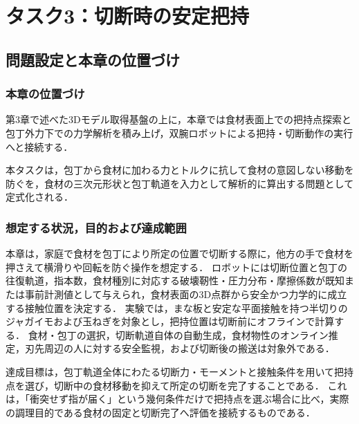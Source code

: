 \chapter{タスク3：切断時の安定把持}
\label{ch:holding}

\section{問題設定と本章の位置づけ}
\label{sec:holding_problem_and_role}

\subsection{本章の位置づけ}
\label{subsec:holding_position}


第3章で述べた3Dモデル取得基盤の上に，本章では食材表面上での把持点探索と包丁外力下での力学解析を積み上げ，双腕ロボットによる把持・切断動作の実行へと接続する．

本タスクは，包丁から食材に加わる力とトルクに抗して食材の意図しない移動を防ぐ{\nameholdingpointset}を，食材の三次元形状と包丁軌道を入力として解析的に算出する問題として定式化される．

\begin{revisionblock}
\subsection{想定する状況，目的および達成範囲}
本章は，家庭で食材を包丁により所定の位置で切断する際に，他方の手で食材を押さえて横滑りや回転を防ぐ操作を想定する．
ロボットには切断位置と包丁の往復軌道，指本数，食材種別に対応する破壊靭性・圧力分布・摩擦係数が既知または事前計測値として与えられ，食材表面の3D点群から安全かつ力学的に成立する接触位置を決定する．
実験では，まな板と安定な平面接触を持つ半切りのジャガイモおよび玉ねぎを対象とし，把持位置は切断前にオフラインで計算する．
食材・包丁の選択，切断軌道自体の自動生成，食材物性のオンライン推定，刃先周辺の人に対する安全監視，および切断後の搬送は対象外である．

達成目標は，包丁軌道全体にわたる切断力・モーメントと接触条件を用いて把持点を選び，切断中の食材移動を抑えて所定の切断を完了することである．
これは，「衝突せず指が届く」という幾何条件だけで把持点を選ぶ場合に比べ，実際の調理目的である食材の固定と切断完了へ評価を接続するものである．
\end{revisionblock}

